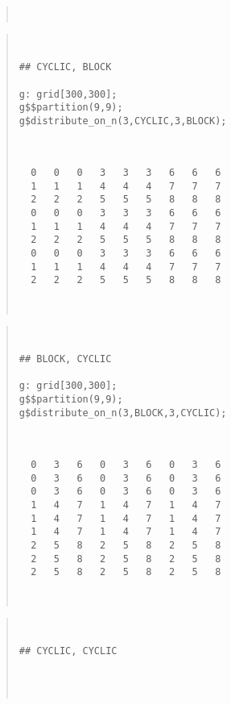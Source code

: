 \documentclass{article}
\newenvironment{example}
  {\begin{quote} ~\hrulefill }
  {~\hrulefill \end{quote} }
\begin{document}
\begin{enumerate}
\begin{example}
\end{example}

\begin{example}

\begin{minipage}{3.5in}
\begin{verbatim}
## CYCLIC, BLOCK

g: grid[300,300];
g$$partition(9,9);
g$distribute_on_n(3,CYCLIC,3,BLOCK);
\end{verbatim}
\end{minipage} \ \
\begin{minipage}{2.5in}
\begin{verbatim}
  0   0   0   3   3   3   6   6   6 
  1   1   1   4   4   4   7   7   7 
  2   2   2   5   5   5   8   8   8 
  0   0   0   3   3   3   6   6   6 
  1   1   1   4   4   4   7   7   7 
  2   2   2   5   5   5   8   8   8 
  0   0   0   3   3   3   6   6   6 
  1   1   1   4   4   4   7   7   7 
  2   2   2   5   5   5   8   8   8 
\end{verbatim}
\end{minipage}

\end{example}

\begin{example}

\begin{minipage}{3.5in}
\begin{verbatim}
## BLOCK, CYCLIC

g: grid[300,300];
g$$partition(9,9);
g$distribute_on_n(3,BLOCK,3,CYCLIC);
\end{verbatim}
\end{minipage} \ \
\begin{minipage}{2.5in}
\begin{verbatim}
  0   3   6   0   3   6   0   3   6 
  0   3   6   0   3   6   0   3   6 
  0   3   6   0   3   6   0   3   6 
  1   4   7   1   4   7   1   4   7 
  1   4   7   1   4   7   1   4   7 
  1   4   7   1   4   7   1   4   7 
  2   5   8   2   5   8   2   5   8 
  2   5   8   2   5   8   2   5   8 
  2   5   8   2   5   8   2   5   8 
\end{verbatim}
\end{minipage}

\end{example}

\begin{example}

\begin{minipage}{3.5in}
\begin{verbatim}
## CYCLIC, CYCLIC 


\end{verbatim}
\end{minipage}
\end{example}
\end{enumerate}
\end{document}
